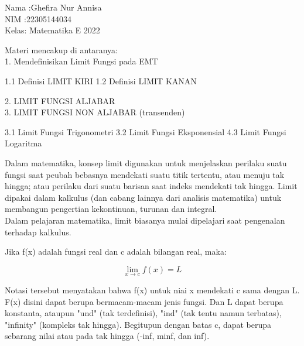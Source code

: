 \documentclass[a4paper,10pt]{article}
\begin{document}
\begin{eulernotebook}
\begin{eulercomment}
Nama :Ghefira Nur Annisa\\
NIM  :22305144034\\
Kelas: Matematika E 2022

\begin{eulercomment}
\begin{eulercomment}
Materi mencakup di antaranya:\\
1. Mendefinisikan Limit Fungsi pada EMT\\
\end{eulercomment}
\begin{eulerttcomment}
   1.1 Definisi LIMIT KIRI
   1.2 Definisi LIMIT KANAN
\end{eulerttcomment}
\begin{eulercomment}
2. LIMIT FUNGSI ALJABAR\\
3. LIMIT FUNGSI NON ALJABAR (transenden)\\
\end{eulercomment}
\begin{eulerttcomment}
   3.1 Limit Fungsi Trigonometri
   3.2 Limit Fungsi Eksponensial
   4.3 Limit Fungsi Logaritma
\end{eulerttcomment}
\begin{eulercomment}


\begin{eulercomment}
\begin{eulercomment}
Dalam matematika, konsep limit digunakan untuk menjelaskan perilaku
suatu fungsi saat peubah bebasnya mendekati suatu titik tertentu, atau
menuju tak hingga; atau perilaku dari suatu barisan saat indeks
mendekati tak hingga. Limit dipakai dalam kalkulus (dan cabang lainnya
dari analisis matematika) untuk membangun pengertian kekontinuan,
turunan dan integral.\\
Dalam pelajaran matematika, limit biasanya mulai dipelajari saat
pengenalan terhadap kalkulus.

\begin{eulercomment}
\begin{eulercomment}
Jika f(x) adalah fungsi real dan c adalah bilangan real, maka:

\end{eulercomment}
\begin{eulerformula}
\[
\lim_{x \to c} f(x) = L
\]
\end{eulerformula}
\begin{eulercomment}
Notasi tersebut menyatakan bahwa f(x) untuk niai x mendekati c sama
dengan L. F(x) disini dapat berupa bermacam-macam jenis fungsi. Dan L
dapat berupa konstanta, ataupun "und" (tak terdefinisi), "ind" (tak
tentu namun terbatas), "infinity" (kompleks tak hingga). Begitupun
dengan batas c, dapat berupa sebarang nilai atau pada tak hingga
(-inf, minf, dan inf).


\end{eulercomment}
\end{eulercomment}
\end{eulercomment}
\end{eulercomment}
\end{eulercomment}
\end{eulercomment}
\end{eulercomment}
\end{eulernotebook}
\end{document}
